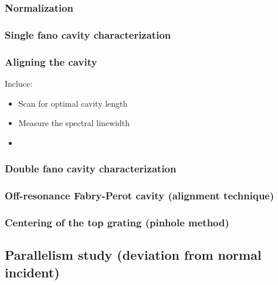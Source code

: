 \subsubsection{Normalization}

\subsubsection{Single fano cavity characterization} 

\subsubsection{Aligning the cavity}

Incluce: 
\begin{itemize}
    \item Scan for optimal cavity length
    \item Measure the spectral linewidth
    \item 
\end{itemize}

\subsubsection{Double fano cavity characterization}

\subsubsection{Off-resonance Fabry-Perot cavity (alignment technique)}

\subsubsection{Centering of the top grating (pinhole method)}

\subsection{Parallelism study (deviation from normal incident)}